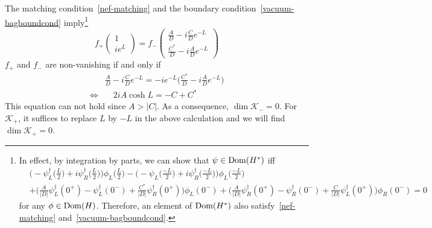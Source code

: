 The matching condition~\cref{nef-matching} and the boundary condition~\cref{vacuum-bagboundcond} imply\footnote{
In effect, by integration by parts, we can show that $\psi\in\mathrm{Dom}(H^*)$ iff 
\begin{equation*}\begin{split}
&\Big(-\psi^\dagger_L\big(\frac L 2 \big) + i\psi_R^\dagger\big(\frac L 2\big) \Big)\phi_L\big(\frac L 2\big)
-\Big(-\psi_L\big(\frac{-L}{ 2} \big) + i\psi_R^\dagger\big(\frac{ -L}{ 2}\big) \Big)\phi_L\big(\frac{ -L}{ 2}\big) \\
&+\Big(\frac{A}{|D|} \psi_L^\dagger(0^+) - \psi_L^\dagger(0^-) + \frac{C^*}{|D|}\psi_R^\dagger(0^+)\Big)\phi_L(0^-) 
+ \Big(\frac{A}{|D|} \psi_R^\dagger(0^+) - \psi_R^\dagger(0^-) + \frac{C}{|D|}\psi_L^\dagger(0^+)\Big)\phi_R(0^-) =0
\end{split}
\end{equation*}
for any $\phi\in\mathrm{Dom}(H)$.
Therefore, an element of $\mathrm{Dom}(H^*)$ also satisfy~\cref{nef-matching} and~\cref{vacuum-bagboundcond}.
}
\begin{equation}
f_+ \begin{pmatrix} 1 \\ ie^L \end{pmatrix}
= f_- \begin{pmatrix} \frac{A}{D} - i\frac{C}{D} e^{-L}  \\
\frac{C^*}{D} - i \frac{A}{D} e^{-L} \end{pmatrix}
\end{equation}
$f_+$ and $f_-$ are non-vanishing if and only if 
\begin{equation}
\begin{split}
& \frac A D - i\frac C D e^{-L} =  -ie^{-L}\big(\frac{ C^*}{ D} -i \frac A D e^{-L}\big) \\
\Leftrightarrow & \quad 2i A \cosh L = -C + C^*
\end{split}
\end{equation}
This equation can not hold since $A > |C|$.
As a consequence, $\dim\mathcal{K}_- = 0$. 
For $\mathcal{K}_+$, it suffices to replace $L$ by $-L$ in the above calculation and we will find $\dim\mathcal{K}_+ = 0$. 

















